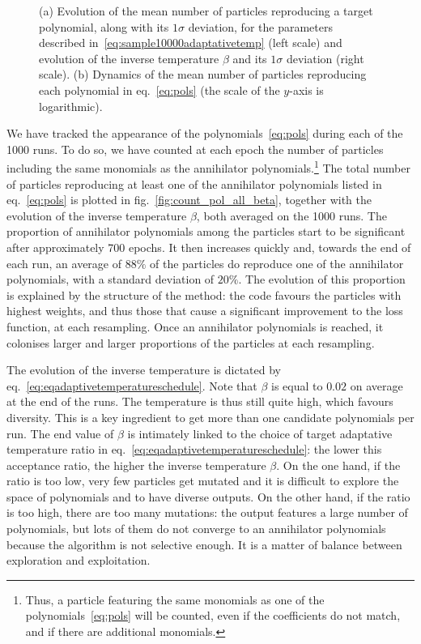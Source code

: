 \documentclass[11pt,a4paper]{article}
\begin{document}
\begin{figure}[b!]
{
		}
		\subfigure{\label{fig:count_pol_indiv}}
		\vspace{-1cm}
		\caption{(a) Evolution of the mean number of particles reproducing a target polynomial, along with its $1\sigma$ deviation, for the parameters described in~\eqref{eq:sample10000adaptativetemp} (left scale) and evolution of the inverse temperature $\beta$ and its $1\sigma$ deviation (right scale). (b) Dynamics of the mean number of particles reproducing each polynomial in eq.~\eqref{eq:pols} (the scale of the $y$-axis is logarithmic).}
		\label{fig:evolutionoftargetreproduction}
	\end{figure}
	  
	We have tracked the appearance of the polynomials~\eqref{eq:pols} during each of the 1000 runs. To do so, we have counted at each epoch the number of particles including the same monomials as the annihilator polynomials.\footnote{Thus, a particle featuring the same monomials as one of the polynomials~\eqref{eq:pols} will be counted, even if the coefficients do not match, and if there are additional monomials.} The total number of particles reproducing at least one of the annihilator polynomials listed in eq.~\eqref{eq:pols} is plotted in fig.~\ref{fig:count_pol_all_beta}, together with the evolution of the inverse temperature $\beta$, both averaged on the 1000 runs. The proportion of annihilator polynomials among the particles start to be significant after approximately 700 epochs. It then increases quickly and, towards the end of each run, an average of $88\%$ of the particles do reproduce one of the annihilator polynomials, with a standard deviation of $20\%$. The evolution of this proportion is explained by the structure of the method: the code favours the particles with highest weights, and thus those that cause a significant improvement to the loss function, at each resampling. Once an annihilator polynomials is reached, it colonises larger and larger proportions of the particles at each resampling.

	The evolution of the inverse temperature is dictated by eq.~\eqref{eq:eqadaptivetemperatureschedule}. Note that $\beta$ is equal to $0.02$ on average at the end of the runs. The temperature is thus still quite high, which favours diversity. This is a key ingredient to get more than one candidate polynomials per run. The end value of $\beta$ is intimately linked to the choice of target adaptative temperature ratio in eq.~\eqref{eq:eqadaptivetemperatureschedule}: the lower this acceptance ratio, the higher the inverse temperature $\beta$. On the one hand, if the ratio is too low, very few particles get mutated and it is difficult to explore the space of polynomials and to have diverse outputs. On the other hand, if the ratio is too high, there are too many mutations: the output features a large number of polynomials, but lots of them do not converge to an annihilator polynomials because the algorithm is not selective enough. It is a matter of balance between exploration and exploitation.
\end{document}

